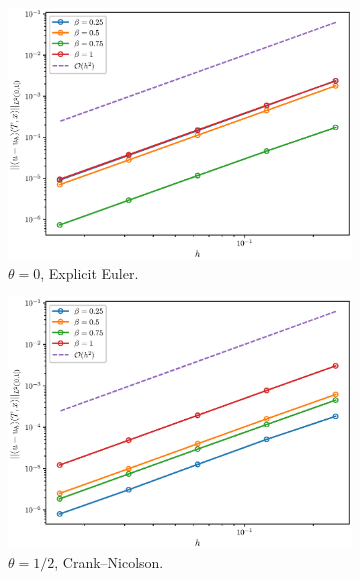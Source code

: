\begin{figure}[h]
\centering
\begin{subfigure}{0.5\textwidth}
  \centering
  \includegraphics[width=1\linewidth]{figures/theta0/l2.eps}
  \caption{$\theta=0$, Explicit Euler.}
  \label{fig:sub1}
\end{subfigure}%
\begin{subfigure}{0.5\textwidth}
  \centering
  \includegraphics[width=1\linewidth]{figures/theta1o2/l2.eps}
  \caption{$\theta=1/2$, Crank--Nicolson.}
  \label{fig:sub2}
\end{subfigure} \\
\begin{subfigure}{0.5\textwidth}
  \centering

\end{subfigure}
\end{figure}
